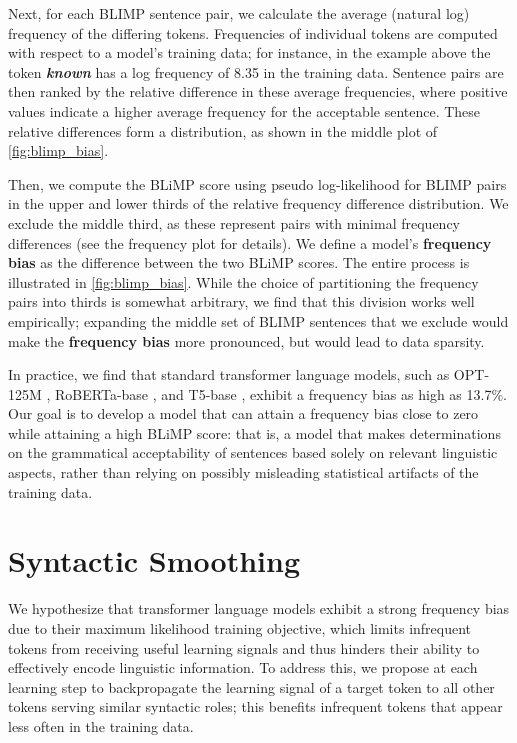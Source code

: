 Next, for each BLIMP sentence pair, we calculate the average (natural log) frequency of the differing tokens. Frequencies of individual tokens are computed with respect to a model's training data; for instance, in the example above the token \textit{\textbf{known}} has a log frequency of 8.35 in the training data. Sentence pairs are then ranked by the relative difference in these average frequencies, where positive values indicate a higher average frequency for the acceptable sentence. These relative differences form a distribution, as shown in the middle plot of \cref{fig:blimp_bias}. 

Then, we compute the BLiMP score using pseudo log-likelihood \citep{salazar2020masked} for BLIMP pairs in the upper and lower thirds of the relative frequency difference distribution. We exclude the middle third, as these represent pairs with minimal frequency differences (see the frequency plot for details). We define a model's \textbf{frequency bias} as the difference between the two BLiMP scores. The entire process is illustrated in \cref{fig:blimp_bias}. While the choice of partitioning the frequency pairs into thirds is somewhat arbitrary, we find that this division works well empirically; expanding the middle set of BLIMP sentences that we exclude would make the \textbf{frequency bias} more pronounced, but would lead to data sparsity. 

In practice, we find that standard transformer language models, such as OPT-125M \citep{zhang2022opt}, RoBERTa-base \citep{liu2019roberta}, and T5-base \citep{raffel2020t5}, exhibit a frequency bias as high as 13.7\%. Our goal is to develop a model that can attain a frequency bias close to zero while attaining a high BLiMP score: that is, a model that makes determinations on the grammatical acceptability of sentences based solely on relevant linguistic aspects, rather than relying on possibly misleading statistical artifacts of the training data. 

\section{Syntactic Smoothing}
\label{sec:smoothing-method}

We hypothesize that transformer language models exhibit a strong frequency bias due to their maximum likelihood training objective, which limits infrequent tokens from receiving useful learning signals and thus hinders their ability to effectively encode linguistic information. To address this, we propose at each learning step to backpropagate the learning signal of a target token to all other tokens serving similar syntactic roles; this benefits infrequent tokens that appear less often in the training data.

